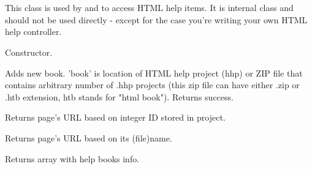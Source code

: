 %
%

\section{}\label{wxhtmlhelpdata}

This class is used by 
and  to access HTML help items.
It is internal class and should not be used directly - except for the case 
you're writing your own HTML help controller.







\label{wxhtmlhelpdatawxhtmlhelpdata}


Constructor.


\label{wxhtmlhelpdataaddbook}


Adds new book. 'book' is location of HTML help project (hhp) or ZIP file
that contains arbitrary number of .hhp projects (this zip file can have
either .zip or .htb extension, htb stands for "html book").
Returns success.


\label{wxhtmlhelpdatafindpagebyid}


Returns page's URL based on integer ID stored in project.


\label{wxhtmlhelpdatafindpagebyname}


Returns page's URL based on its (file)name.


\label{wxhtmlhelpdatagetbookrecarray}


Returns array with help books info.

\label{wxhtmlhelpdatagetcontents}

